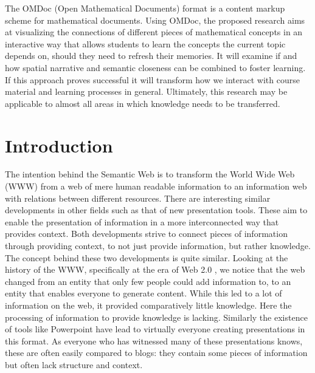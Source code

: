 \documentclass[twoside, 12pt]{article}
\begin{document}
The OMDoc (Open Mathematical Documents) format \cite{Kohlhase:OMDoc1.2} is a content markup scheme for mathematical documents. Using OMDoc, the proposed research aims at visualizing the connections of different pieces of mathematical concepts in an interactive way that allows students to learn the concepts the current topic depends on, should they need to refresh their memories. It will examine if and how spatial narrative and semantic closeness can be combined to foster learning. If this approach proves successful it will transform how we interact with course material and learning processes in general. Ultimately, this research may be applicable to almost all areas in which knowledge needs to be transferred.\\ 

  \newpage
  \tableofcontents

  \clearpage

  \section{Introduction}
  \label{sec:introduction}

The intention behind the Semantic Web \cite{BernersLee:tsw98} is to transform the World Wide Web (WWW) from a web of mere human readable information to an information web with relations between different resources. There are interesting similar developments in other fields such as that of new presentation tools. These aim to enable the presentation of information in a more interconnected way that provides context. Both developments strive to connect pieces of information through providing context, to not just provide information, but rather knowledge.\\

The concept behind these two developments is quite similar. Looking at the history of the WWW, specifically at the era of Web 2.0 \cite{Weller:npentrel14}, we notice that the web changed from an entity that only few people could add information to, to an entity that enables everyone to generate content. While this led to a lot of information on the web, it provided comparatively little knowledge. Here the processing of information to provide knowledge is lacking. Similarly the existence of tools like Powerpoint have lead to virtually everyone creating presentations in this format. As everyone who has witnessed many of these presentations knows, these are often easily compared to blogs: they contain some pieces of information but often lack structure and context.\\
\end{document}
